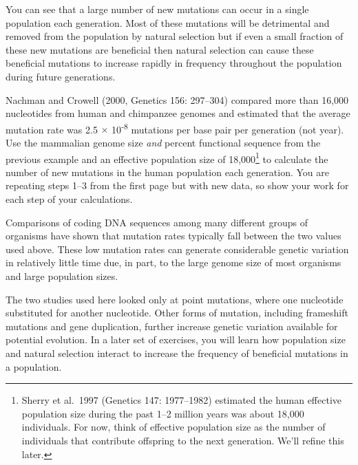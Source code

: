 \documentclass[11pt, addpoints, hidelinks]{exam}
\begin{document}
\begin{questions}
\newpage

You can see that a large number of new mutations can occur in a single
population each generation. Most of these mutations will be detrimental
and removed from the population by natural selection but if even a small
fraction of these new mutations are beneficial then natural selection
can cause these beneficial mutations to increase rapidly in frequency
throughout the population during future generations.

\question[4]
\label{itm:nachman} Nachman and Crowell (2000, Genetics 156: 297--304) compared
more than 16,000 nucleotides from human and chimpanzee genomes and
estimated that the average mutation rate was 2.5 $\times$
10\textsuperscript{-8} mutations per base pair per generation (not year). Use
the mammalian genome size \emph{and} percent functional sequence from the
previous example and an effective population size of
18,000\footnote{Sherry et al.~1997 (Genetics 147: 1977--1982) estimated
 the human effective population size during the past 1--2 million years
 was about 18,000 individuals. For now, think of effective population size as the number of individuals that contribute offspring to the next generation. We'll refine this later.} to calculate the number of new
mutations in the human population each generation. You are repeating steps 
1--3 from the first page but with new data, so show your work for
each step of your calculations. 

\ifprintanswers{}
\else
\fi

Comparisons of coding DNA sequences among many different
groups of organisms have shown that mutation rates typically fall
between the two values used above. These low mutation rates
can generate considerable genetic variation in relatively little time
due, in part, to the large genome size of most organisms and large
population sizes.

The two studies used here looked only at point mutations, where one nucleotide 
substituted for another nucleotide. Other forms of mutation, including frameshift mutations and gene duplication, further increase genetic variation available
for potential evolution. In a later set of exercises, you will learn how population
size and natural selection interact to increase the frequency of beneficial mutations
in a population.


\end{questions}
\end{document}
